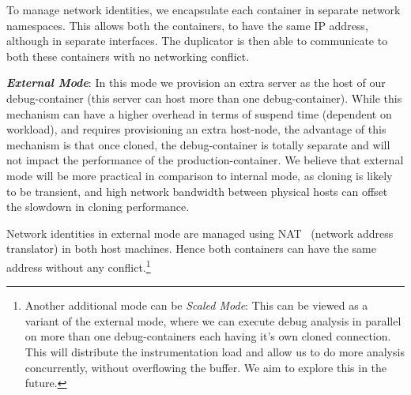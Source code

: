 To manage network identities, we encapsulate each container in separate network namespaces.
This allows both the containers, to have the same IP address, although in separate interfaces.
The duplicator is then able to communicate to both these containers with no networking conflict.

\noindent
\textbf{\textit{External Mode}}: In this mode we provision an extra server as the host of our debug-container (this server can host more than one debug-container). 
While this mechanism can have a higher overhead in terms of suspend time (dependent on workload), and requires provisioning an extra host-node, the advantage of this mechanism is that once cloned, the debug-container is totally separate and will not impact the performance of the production-container.
We believe that external mode will be more practical in comparison to internal mode, as cloning is likely to be transient, and high network bandwidth between physical hosts can offset the slowdown in cloning performance. 

Network identities in external mode are managed using NAT~\cite{nat} (network address translator) in both host machines. 
Hence both containers can have the same address without any conflict.\footnote{Another additional mode can be \textit{Scaled Mode}: This can be viewed as a variant of the external mode, where we can execute debug analysis in parallel on more than one debug-containers each having it's own cloned connection. This will distribute the instrumentation load and allow us to do more analysis concurrently, without overflowing the buffer. We aim to explore this in the future.}




